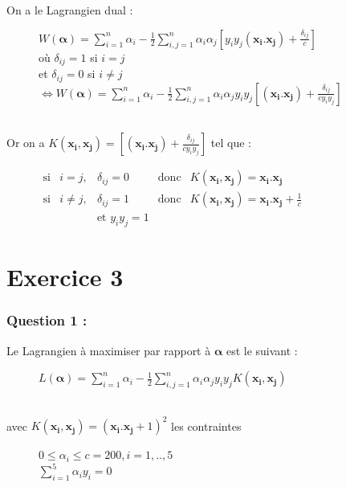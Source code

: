 \documentclass[a4paper, 10pt]{article}
\begin{document}
On a le Lagrangien dual :
\begin{figure}[h!]
 \centering
$W(\boldsymbol{\alpha}) = \sum^{n}_{i=1}\alpha_{i} - \frac{1}{2}\sum^{n}_{i,j=1}\alpha_{i}\alpha_{j}[y_{i}y_{j}(\mathbf{x_{i}}.\mathbf{x_{j}})+ \frac{\delta_{ij}}{c}]$\\
où $\delta_{ij} = 1$ si $i=j$\\
et $\delta_{ij} = 0$ si $i\neq j$\\
$\Longleftrightarrow W(\boldsymbol{\alpha}) = \sum^{n}_{i=1}\alpha_{i} - \frac{1}{2}\sum^{n}_{i,j=1}\alpha_{i}\alpha_{j}y_{i}y_{j}[(\mathbf{x_{i}}.\mathbf{x_{j}})+ \frac{\delta_{ij}}{cy_{i}y_{j}}]$\\
\end{figure}\\
Or on a $K(\mathbf{x_{i}},\mathbf{x_{j}}) = [(\mathbf{x_{i}}.\mathbf{x_{j}})+ \frac{\delta_{ij}}{cy_{i}y_{j}}]$ tel que :

\begin{figure}[h!]
 \centering
$
    \begin{array}{llrll}
	\mbox{si} & i = j, & \delta_{ij} = 0 & \mbox{donc} & K(\mathbf{x_{i}},\mathbf{x_{j}}) = \mathbf{x_{i}}.\mathbf{x_{j}}\\
	\mbox{si} & i \neq j, & \delta_{ij} = 1 & \mbox{donc} & K(\mathbf{x_{i}},\mathbf{x_{j}}) = \mathbf{x_{i}}.\mathbf{x_{j}} + \frac{1}{c}\\
	 & & \mbox{et } y_{i}y_{j} = 1 & &
      \end{array}
 $
\end{figure}

\newpage
\section*{Exercice 3}

\subsubsection*{Question 1 :}

Le Lagrangien à maximiser par rapport à $\boldsymbol{\alpha}$ est le suivant :
\begin{figure}[h!]
 \centering
$L(\boldsymbol{\alpha})= \sum^{n}_{i=1}\alpha_{i} - \frac{1}{2}\sum^{n}_{i,j=1}\alpha_{i}\alpha_{j}y_{i}y_{j}K(\mathbf{x_{i}},\mathbf{x_{j}})$
\end{figure}\\
avec $K(\mathbf{x_{i}},\mathbf{x_{j}}) = (\mathbf{x_{i}}.\mathbf{x_{j}} + 1)^{2}$ les contraintes
\begin{figure}[h!]
 \centering
$ 0 \leq \alpha_{i} \leq c = 200, i = 1, . ., 5$\\
$\sum^{5}_{i=1}\alpha_{i}y_{i} = 0$
\end{figure}
\end{document}

